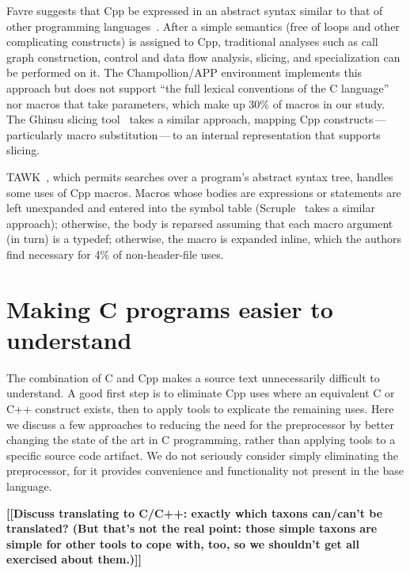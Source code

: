 \documentclass[10pt]{article}
\newcommand{\comment}[1]{\textbf{[[#1]]}}
\begin{document}
Favre suggests that Cpp be expressed in an abstract syntax similar to that
of other programming languages~\cite{Favre96}.  After a simple semantics
(free of loops and other complicating constructs) is assigned to Cpp,
traditional analyses such as call graph construction, control and data flow
analysis, slicing, and specialization can be performed on it.  The
Champollion/APP environment implements this approach but does not support
``the full lexical conventions of the C language'' nor macros that take
parameters, which make up 30\% of macros in our study.  The Ghinsu slicing
tool~\cite{LivadasS94} takes a similar approach, mapping Cpp
constructs\,---\,particularly macro substitution\,---\,to an internal
representation that supports slicing.

TAWK~\cite{GriswoldAM96}, which permits searches over a program's abstract
syntax tree, handles some uses of Cpp macros.  Macros whose bodies are
expressions or statements are left unexpanded and entered into the symbol
table (Scruple~\cite{PaulP94} takes a similar approach); otherwise, the
body is reparsed assuming that each macro argument (in turn) is a typedef;
otherwise, the macro is expanded inline, which the authors find necessary
for 4\% of non-header-file uses.





\section{Making C programs easier to understand}
\label{sec:easier-to-understand}

The combination of C and Cpp makes a source text unnecessarily difficult
to understand.  A good first step is to eliminate Cpp uses where an
equivalent C or C++ construct exists, then to apply tools to explicate
the remaining uses.  Here we discuss a few approaches to reducing the
need for the preprocessor by better changing the state of the art in C
programming, rather than applying tools to a specific source code
artifact.  We do not seriously consider simply eliminating the
preprocessor, for it provides convenience and functionality not present
in the base language.

\comment{Discuss translating to C/C++:  exactly which taxons can/can't be
  translated?  (But that's not the real point:  those simple taxons are
  simple for other tools to cope with, too, so we shouldn't get all
  exercised about them.)}
\end{document}
